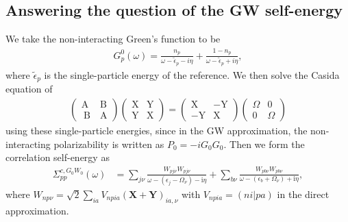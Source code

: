 \subsection{Answering the question of the GW self-energy }
We take the non-interacting Green's function to be 
\begin{align}
    G_p^0(\omega)=\frac{n_p}{\omega-\tilde{\epsilon}_p-i \eta}+\frac{1-n_p}{\omega-\tilde{\epsilon}_p+i \eta},
\end{align}
where $\tilde{\epsilon}_p$ is the single-particle energy of the reference. We then solve the Casida equation of 
\begin{align}
    \left(\begin{array}{ll}
\mathrm{A} & \mathrm{~B} \\
\mathrm{~B} & \mathrm{~A}
\end{array}\right)\left(\begin{array}{ll}
\mathrm{X} & \mathrm{Y} \\
\mathrm{Y} & \mathrm{X}
\end{array}\right)=\left(\begin{array}{cc}
\mathrm{X} & -\mathrm{Y} \\
-\mathrm{Y} & \mathrm{X}
\end{array}\right)\left(\begin{array}{ll}
\Omega & 0 \\
0 & \Omega
\end{array}\right)
\end{align}
using these single-particle energies, since in the GW approximation, the non-interacting polarizability is written as $P_0=-iG_0G_0$. Then we form the correlation self-energy as 
\begin{align}
    \Sigma_{pp}^{c,G_0W_0}(\omega)&= \sum_{j \nu}\frac{W_{p j \nu} W_{p j \nu}}{\omega-\left(\epsilon_j-\Omega_\nu\right)-\mathrm{i} \eta} + \sum_{b \nu}\frac{W_{p b \nu} W_{p b \nu}}{\omega-\left(\epsilon_b+\Omega_\nu\right)+\mathrm{i} \eta},
\end{align}
where $W_{n p \nu}=\sqrt{2}\sum_{i a} V_{n p i a}(\mathbf{X}+\mathbf{Y})_{i a, \nu}$ with $V_{n p i a}=(n i|p a)$ in the direct approximation.
